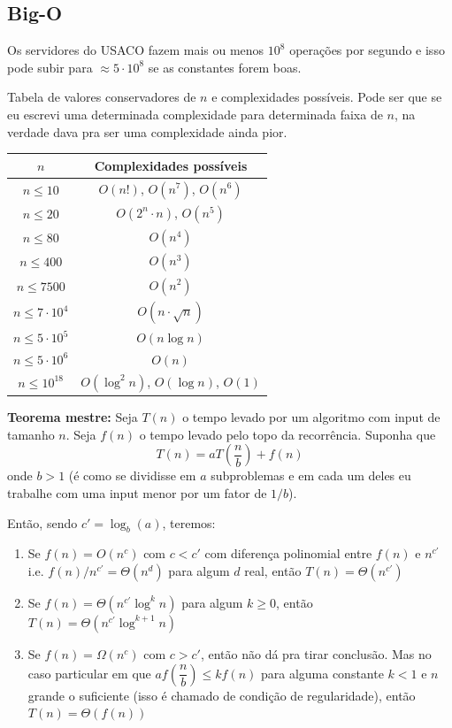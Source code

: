 \subsection{Big-O}

Os servidores do USACO fazem mais ou menos $10^8$ operações por segundo e isso pode subir 
para $ \approx 5 \cdot 10^8$ se as constantes forem boas.

Tabela de valores conservadores de $n$ e complexidades possíveis. Pode ser que se eu
escrevi uma determinada complexidade para determinada faixa de $n$, na verdade dava pra
ser uma complexidade ainda pior.


\begin{tabular}{|c|c|}
\hline
\textbf{$n$} & \textbf{Complexidades possíveis} \\
\hline
$n \leq 10$ & $O(n!)$, $O(n^7)$, $O(n^6)$ \\ \hline 
$n \leq 20$ & $O(2^n \cdot n)$, $O(n^5)$ \\ \hline
$n \leq 80$ & $O(n^4)$ \\ \hline
$n \leq 400$ & $O(n^3)$ \\ \hline
$n \leq 7500$ & $O(n^2)$ \\ \hline
$n \leq 7 \cdot 10^4$ & $O(n \cdot \sqrt{n})$ \\ \hline
$n \leq 5 \cdot 10^5$ & $ O(n \log n)$\\ \hline
$n \leq 5 \cdot 10^6$ & $ O(n)$ \\ \hline
$n \leq 10^{18}$ & $O(\log^2 n)$, $O(\log n)$, $O(1)$ \\ \hline
\end{tabular}

\textbf{Teorema mestre:} Seja $T(n)$ o tempo levado por um algoritmo com input de
tamanho $n$. Seja $f(n)$ o tempo levado pelo topo da recorrência. Suponha que 
$$T(n) = a T \left( \dfrac{n}{b} \right) + f(n)$$
onde $b>1$ (é como se dividisse em $a$ subproblemas e em cada um deles eu trabalhe
com uma input menor por um fator de $1/b$).

Então, sendo $c' = \log_b(a)$, teremos:

\begin{enumerate}

    \item Se $f(n) = O(n^c)$ com $c < c'$ com diferença polinomial entre $f(n)$ e $n^{c'}$ i.e. $f(n)/n^{c'} = \Theta(n^d)$
    para algum $d$ real, então $T(n) = \Theta(n^{c'})$
    \item Se $f(n) = \Theta (n^{c'} \log^k n)$ para algum $k \geq 0$, então $T(n) = \Theta(n^{c'} \log^{k+1} n)$
    \item Se $f(n) = \Omega (n^c)$ com $c > c'$, então não dá pra tirar conclusão. Mas no caso 
    particular em que $a f \left( \dfrac{n}{b} \right) \leq k f(n)$ para alguma constante $k < 1$ e $n$ grande
    o suficiente (isso é chamado de condição de regularidade), então $T(n) = \Theta (f(n))$ 

\end{enumerate}

